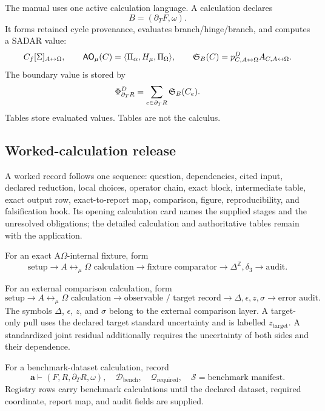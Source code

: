 The manual uses one active calculation language. A calculation declares
\[
B=(\partial_TF,\omega).
\]
It forms retained cycle provenance, evaluates branch/hinge/branch, and computes a SADAR value:
\[
C_f[\Sigma]_{A{\leftrightarrow}\Omega},
\qquad
\mathsf{AO}_{\mu}(C)=\langle\Pi_\alpha,H_\mu,\Pi_\Omega\rangle,
\qquad
\mathfrak S_B(C)=p^D_{C,A{\leftrightarrow}\Omega}A_{C,A{\leftrightarrow}\Omega}.
\]
The boundary value is stored by
\[
\Phi^D_{\partial_T R}=\sum_{e\in\partial_T R}\mathfrak S_B(C_e).
\]
Tables store evaluated values. Tables are not the calculus.

\subsection{Worked-calculation release}\label{manual:worked-calculation-release}
A worked record follows one sequence: question, dependencies, cited input,
declared reduction, local choices, operator chain, exact block, intermediate
table, exact output row, exact-to-report map, comparison, figure,
reproducibility, and falsification hook. Its opening calculation card names
the supplied stages and the unresolved obligations; the detailed calculation
and authoritative tables remain with the application.

For an exact A\(\Omega\)-internal fixture, form
\[
\text{setup}
\to
A\leftrightarrow_{\mu}\Omega\text{ calculation}
\to
\text{fixture comparator}
\to
\Delta^{\mathbb Z},\delta_3
\to
\text{audit}.
\]

For an external comparison calculation, form
\[
\text{setup}
\to
A\leftrightarrow_{\mu}\Omega\text{ calculation}
\to
\text{observable / target record}
\to
\Delta,\epsilon,z,\sigma
\to
\text{error audit}.
\]
The symbols \(\Delta\), \(\epsilon\), \(z\), and \(\sigma\) belong to the external comparison layer. A target-only pull uses the declared target standard uncertainty and is
labelled \(z_{\mathrm{target}}\). A standardized joint residual additionally
requires the uncertainty of both sides and their dependence.

For a benchmark-dataset calculation, record
\[
\mathbf a\vdash(F,R,\partial_T R,\omega),\quad
\mathcal D_{\mathrm{bench}},\quad
\mathcal Q_{\mathrm{required}},\quad
\mathcal S=\text{benchmark manifest}.
\]
Registry rows carry benchmark calculations until the declared dataset, required coordinate, report map, and audit fields are supplied.


